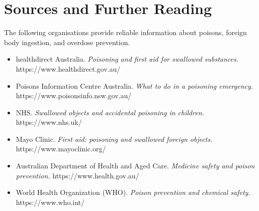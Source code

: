 \section*{Sources and Further Reading}
The following organisations provide reliable information about poisons, foreign body ingestion, and overdose prevention.

\begin{itemize}
    \item healthdirect Australia. \textit{Poisoning and first aid for swallowed substances.} https://www.healthdirect.gov.au/
    \item Poisons Information Centre Australia. \textit{What to do in a poisoning emergency.} https://www.poisonsinfo.nsw.gov.au/
    \item NHS. \textit{Swallowed objects and accidental poisoning in children.} https://www.nhs.uk/
    \item Mayo Clinic. \textit{First aid: poisoning and swallowed foreign objects.} https://www.mayoclinic.org/
    \item Australian Department of Health and Aged Care. \textit{Medicine safety and poison prevention.} https://www.health.gov.au/
    \item World Health Organization (WHO). \textit{Poison prevention and chemical safety.} https://www.who.int/
\end{itemize}

\clearpage
